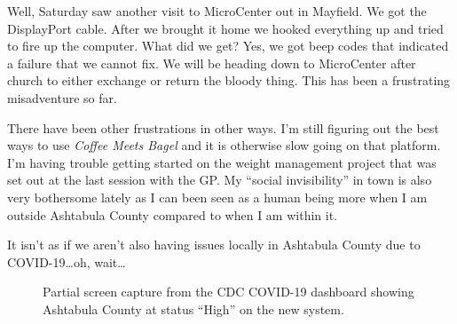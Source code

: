 Well, Saturday saw another visit to MicroCenter out in Mayfield. We got
the DisplayPort cable. After we brought it home we hooked everything up
and tried to fire up the computer. What did we get? Yes, we got beep
codes that indicated a failure that we cannot fix. We will be heading
down to MicroCenter after church to either exchange or return the bloody
thing. This has been a frustrating misadventure so far.

There have been other frustrations in other ways. I'm still figuring out
the best ways to use \emph{Coffee Meets Bagel} and it is otherwise slow
going on that platform. I'm having trouble getting started on the weight
management project that was set out at the last session with the GP. My
``social invisibility'' in town is also very bothersome lately as I can
been seen as a human being more when I am outside Ashtabula County
compared to when I am within it.

It isn't as if we aren't also having issues locally in Ashtabula County
due to COVID-19\ldots oh, wait\ldots{}

\begin{figure}
\centering
{}
\caption{Partial screen capture from the CDC COVID-19 dashboard showing
Ashtabula County at status ``High'' on the new system.}
\end{figure}
